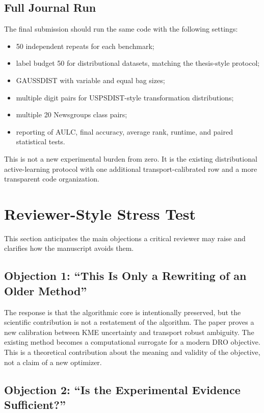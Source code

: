 \documentclass[10pt,journal]{IEEEtran}
\begin{document}
\subsection{Full Journal Run}

The final submission should run the same code with the following settings:
\begin{itemize}[leftmargin=1.1em]
\item 50 independent repeats for each benchmark;
\item label budget 50 for distributional datasets, matching the thesis-style protocol;
\item GAUSSDIST with variable and equal bag sizes;
\item multiple digit pairs for USPSDIST-style transformation distributions;
\item multiple 20 Newsgroups class pairs;
\item reporting of AULC, final accuracy, average rank, runtime, and paired statistical tests.
\end{itemize}
This is not a new experimental burden from zero. It is the existing distributional active-learning protocol with one additional transport-calibrated row and a more transparent code organization.

\section{Reviewer-Style Stress Test}
\label{sec:stress}

This section anticipates the main objections a critical reviewer may raise and clarifies how the manuscript avoids them.

\subsection{Objection 1: ``This Is Only a Rewriting of an Older Method''}

The response is that the algorithmic core is intentionally preserved, but the scientific contribution is not a restatement of the algorithm. The paper proves a new calibration between KME uncertainty and transport robust ambiguity. The existing method becomes a computational surrogate for a modern DRO objective. This is a theoretical contribution about the meaning and validity of the objective, not a claim of a new optimizer.

\subsection{Objection 2: ``Is the Experimental Evidence Sufficient?''}
\end{document}

